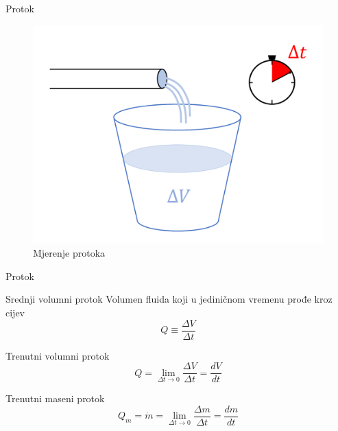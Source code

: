 \documentclass[croatian]{beamer}
\begin{document}
\begin{frame}{Protok}

\begin{figure}
\includegraphics[scale=0.3]{figs/protok}\caption{Mjerenje protoka}
\end{figure}
\end{frame}

\begin{frame}{Protok}

\begin{alertblock}{Srednji volumni protok}
Volumen fluida koji u jediničnom vremenu prođe kroz cijev
\[
Q\equiv\frac{\Delta V}{\Delta t}
\]
\end{alertblock}

\begin{block}{Trenutni volumni protok}
\[
Q=\lim_{\Delta t\rightarrow0}\frac{\Delta V}{\Delta t}=\frac{dV}{dt}
\]
\end{block}

\begin{block}{Trenutni maseni protok}
\[
Q_{m}=\dot{m}=\lim_{\Delta t\rightarrow0}\frac{\Delta m}{\Delta t}=\frac{dm}{dt}
\]
\end{block}
\end{frame}
\end{document}
